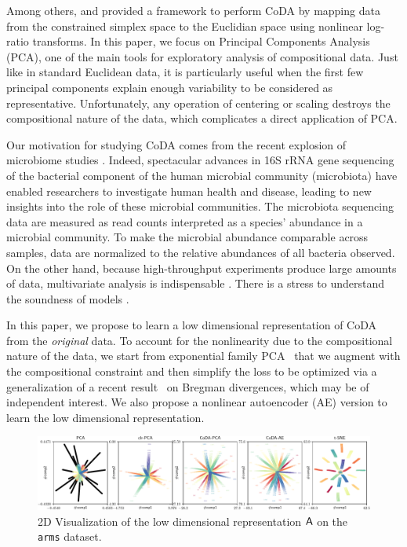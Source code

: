 \documentclass{article}
\begin{document}
Among others, \cite{aTSJ} and \cite{epmbIL} provided a framework to perform CoDA
by mapping data from the constrained simplex space to the Euclidian space using nonlinear log-ratio transforms.
In this paper, we focus on Principal Components Analysis (PCA),
one of the main tools for exploratory analysis of compositional data.
Just like in standard Euclidean data, it is particularly useful when the first few principal components explain enough variability to be considered as representative.
Unfortunately, any operation of centering or scaling destroys the compositional nature of
the data, which complicates a direct application of PCA.

Our motivation for studying CoDA comes from the recent
explosion of microbiome studies \cite{grCAA, gwpeIAR}.
Indeed, spectacular advances in 16S rRNA gene sequencing of the bacterial component of the human microbial community (microbiota) have enabled researchers to investigate human health and disease, leading to new insights into the role of these microbial communities.
The microbiota sequencing data are measured as read counts interpreted as a species' abundance in a microbial community. To make the microbial abundance comparable across samples, data are normalized to the relative abundances of all bacteria observed.
On the other hand, because high-throughput experiments produce large amounts of data, multivariate analysis is indispensable \cite{psAMS,haAMCC}.
There is a stress to understand the soundness of models \cite{aeCD}.

In this paper, we propose to learn a low dimensional representation of CoDA from the
\emph{original} data. To account for the nonlinearity due to the compositional nature
of the data, we start from exponential family PCA~\cite{cdsAG} that we
augment with the compositional constraint and then simplify the loss
to be optimized via a generalization of a recent result~\cite{nmoAS}
on Bregman divergences, which may be of independent interest.
We also propose a nonlinear
autoencoder (AE) version to learn the low dimensional representation.

\begin{figure}[t]
\centering
\includegraphics[width=\textwidth]{20arms_scatter.pdf}
\caption{2D Visualization of the low dimensional representation $\mathsf{A}$ on the \texttt{arms} dataset.}\label{fig:arms}
\end{figure}
\end{document}
